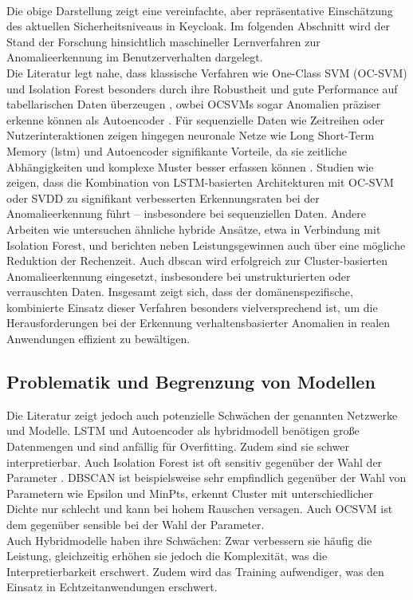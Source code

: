\documentclass[a4paper,12pt]{article}
\let\footnote=\endnote
\begin{document}
	\\[0.5em]
	Die obige Darstellung zeigt eine vereinfachte, aber repräsentative Einschätzung des aktuellen Sicherheitsniveaus in Keycloak. Im folgenden Abschnitt wird der Stand der Forschung hinsichtlich maschineller Lernverfahren zur Anomalieerkennung im Benutzerverhalten dargelegt.
	\\[0.5em]
	Die Literatur legt nahe, dass klassische Verfahren wie One-Class SVM (OC-SVM) und Isolation Forest besonders durch ihre Robustheit und gute Performance auf tabellarischen Daten überzeugen \cite{pang2021deep}, owbei OCSVMs sogar Anomalien präziser erkenne können als Autoencoder \cite{arjunan2024}. Für sequenzielle Daten wie Zeitreihen oder Nutzerinteraktionen zeigen hingegen neuronale Netze wie Long Short-Term Memory (\gls{lstm}) und Autoencoder signifikante Vorteile, da sie zeitliche Abhängigkeiten und komplexe Muster besser erfassen können \cite{demir2024comparative}. Studien wie \cite{ergen2017unsupervised} zeigen, dass die Kombination von LSTM-basierten Architekturen mit OC-SVM oder SVDD \footnote{https://github.com/lukasruff/Deep-SVDD-PyTorch} zu signifikant verbesserten Erkennungsraten bei der Anomalieerkennung führt – insbesondere bei sequenziellen Daten. Andere Arbeiten wie \cite{ghrib2020hybrid} untersuchen ähnliche hybride Ansätze, etwa in Verbindung mit Isolation Forest, und berichten neben Leistungsgewinnen auch über eine mögliche Reduktion der Rechenzeit. Auch \gls{dbscan} wird erfolgreich zur Cluster-basierten Anomalieerkennung eingesetzt, insbesondere bei unstrukturierten oder verrauschten Daten. Insgesamt zeigt sich, dass der domänenspezifische, kombinierte Einsatz dieser Verfahren besonders vielversprechend ist, um die Herausforderungen bei der Erkennung verhaltensbasierter Anomalien in realen Anwendungen effizient zu bewältigen.
	
	\subsection{Problematik und Begrenzung von Modellen}
	Die Literatur zeigt jedoch auch potenzielle Schwächen der genannten Netzwerke und Modelle. LSTM und Autoencoder als \gls{hybridmodell} benötigen große Datenmengen und sind anfällig für Overfitting. Zudem sind sie schwer interpretierbar. Auch Isolation Forest ist oft sensitiv gegenüber der Wahl der Parameter \cite{chua2024web}. DBSCAN ist beispielsweise sehr empfindlich gegenüber der Wahl von Parametern wie Epsilon und MinPts, erkennt Cluster mit unterschiedlicher Dichte nur schlecht und kann bei hohem Rauschen versagen. Auch OCSVM ist dem gegenüber sensible bei der Wahl der Parameter.
	\\[0.5em]
	Auch Hybridmodelle haben ihre Schwächen: Zwar verbessern sie häufig die Leistung, gleichzeitig erhöhen sie jedoch die Komplexität, was die Interpretierbarkeit erschwert. Zudem wird das Training aufwendiger, was den Einsatz in Echtzeitanwendungen erschwert.
	
\end{document}
